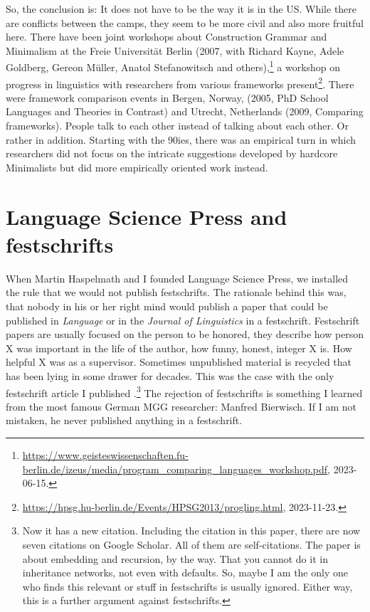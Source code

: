 \documentclass[output=paper,colorlinks,citecolor=brown]{langscibook}
\begin{document}


So, the conclusion is: It does not have to be the way it is in the US. While there are conflicts between the camps,
they seem to be more civil and also more fruitful here. There have been joint workshops about
Construction Grammar and Minimalism at the Freie Universität Berlin (2007, with Richard Kayne, Adele
Goldberg, Gereon Müller, Anatol Stefanowitsch and others),\footnote{
\url{https://www.geisteswissenschaften.fu-berlin.de/izeus/media/program_comparing_languages_workshop.pdf},
2023-06-15.
} a workshop on progress
in linguistics with researchers from various frameworks present\footnote{
\url{https://hpsg.hu-berlin.de/Events/HPSG2013/progling.html}, 2023-11-23.
}. There were framework comparison
events in Bergen, Norway, (2005, PhD School Languages and Theories in Contrast) and Utrecht,
Netherlands (2009, Comparing frameworks). People talk to each
other instead of talking about each other. Or rather in addition. Starting with the 90ies, there was an empirical
turn in which researchers did not focus on the intricate suggestions developed by hardcore Minimalists
but did more empirically oriented work instead.


\section{Language Science Press and festschrifts}

When Martin Haspelmath and I founded Language Science Press, we installed the rule that we would
not publish festschrifts. The rationale behind this was, that nobody in his or her right mind would
publish a paper that could be published in \emph{Language} or in the \emph{Journal of Linguistics} in a
festschrift. Festschrift papers are usually focused on the person to be honored, they describe how
person X was important in the life of the author, how funny, honest, integer X is. How helpful X was
as a supervisor. Sometimes
unpublished material is recycled that has been lying in some drawer for decades. This was the case
with the only festschrift article I published \citep{MuellerDefaults}.\footnote{
  Now it has a new citation. Including the citation in this paper, there are now seven citations on
  Google Scholar. All of them are self-citations. The paper is about embedding and recursion, by the way. That you
  cannot do it in inheritance networks, not even with defaults. So, maybe I am the only one who
  finds this relevant or stuff in festschrifts is usually ignored. Either way, this is a further
  argument against festschrifts.
}
The rejection of festschrifts is something I learned from the most famous German MGG researcher:
Manfred Bierwisch. If I am not mistaken, he never published anything in a festschrift.
\end{document}
